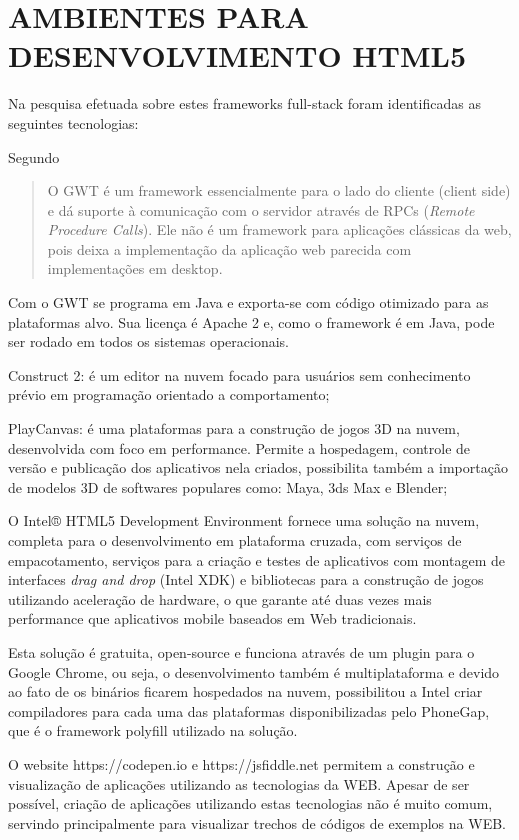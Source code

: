 \chapter{AMBIENTES PARA DESENVOLVIMENTO HTML5}

Na pesquisa efetuada sobre estes frameworks full-stack foram
identificadas as seguintes tecnologias:

Segundo \cite[pp. 29]{gtw}
\begin{quote}
O GWT é um framework essencialmente para o lado do cliente (client
side) e dá suporte à comunicação com o servidor através de RPCs
(\textit{Remote Procedure Calls}). Ele não é um framework para
aplicações clássicas da web, pois deixa a implementação da
aplicação web parecida com implementações em desktop.
\end{quote}

Com o GWT se programa em Java e exporta-se com código otimizado para
as plataformas alvo. Sua licença é Apache 2 e, como o framework é em Java,
pode ser rodado em todos os sistemas operacionais.

Construct 2: é um editor na nuvem focado para usuários sem
conhecimento prévio em programação orientado a comportamento;

PlayCanvas: é uma plataformas para a construção de jogos 3D
na nuvem, desenvolvida com foco em performance. Permite a hospedagem,
controle de versão e publicação dos aplicativos nela criados,
possibilita também a importação de modelos 3D de softwares populares
como: Maya, 3ds Max e Blender;

O Intel® HTML5 Development Environment  fornece uma solução na nuvem,
completa para o desenvolvimento em plataforma cruzada, com serviços de
empacotamento, serviços para a criação e testes de aplicativos com
montagem de interfaces \textit{drag and drop} (Intel XDK) e bibliotecas para a
construção de jogos utilizando aceleração de hardware, o que garante
até duas vezes mais performance que aplicativos mobile baseados em
Web tradicionais. 

Esta solução é gratuita, open-source e funciona através de um
plugin para o Google Chrome, ou seja, o desenvolvimento também é
multiplataforma e devido ao fato de os binários ficarem hospedados
na nuvem, possibilitou a Intel criar compiladores para cada uma das
plataformas disponibilizadas pelo PhoneGap, que é o framework polyfill
utilizado na solução.

O website https://codepen.io e https://jsfiddle.net permitem a construção e visualização de aplicações utilizando as tecnologias da WEB. Apesar de ser possível, criação de aplicações utilizando estas tecnologias não é muito comum, servindo principalmente para visualizar trechos de códigos de exemplos na WEB.


